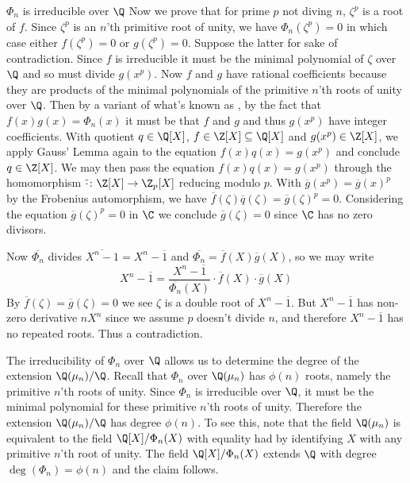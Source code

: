 \begin{theorem}{$\Phi_n$ is irreducible over $\Q$}
    Now we prove that for prime $p$ not diving $n$, $\zeta^p$ is a root of $f$.
    Since $\zeta^p$ is an $n$'th primitive root of unity, we have $\Phi_n(\zeta^p)=0$ in which case either $f(\zeta^p)=0$ or $g(\zeta^p)=0$.
    Suppose the latter for sake of contradiction.
    Since $f$ is irreducible it must be the minimal polynomial of $\zeta$ over $\Q$ and so must divide $g(x^p)$.
    Now $f$ and $g$ have rational coefficients because they are products of the minimal polynomials of the primitive $n$'th roots of unity over $\Q$.
    Then by a variant of what's known as , by the fact that $f(x)g(x)=\Phi_n(x)$ it must be that $f$ and $g$ and thus $g(x^p)$ have integer coefficients.
    With quotient $q\in\Q[X]$, $f\in\Z[X]\subseteq\Q[X]$ and $g(x^p)\in\Z[X]$, we apply Gauss' Lemma again to the equation $f(x)q(x)=g(x^p)$ and conclude $q\in\Z[X]$.
    We may then pass the equation $f(x)q(x)=g(x^p)$ through the homomorphism $\overline{\cdot}\colon\Z[X]\to\Z_p[X]$ reducing modulo $p$.
    With $\overline{g}(x^p)=\overline{g}(x)^p$ by the Frobenius automorphism, we have $\overline{f}(\zeta)\overline{q}(\zeta)=\overline{g}(\zeta)^p=0$.
    Considering the equation $\overline{g}(\zeta)^p=0$ in $\C$ we conclude $\overline{g}(\zeta)=0$ since $\C$ has no zero divisors.

    Now $\overline{\Phi_n}$ divides $\overline{X^n-1}=X^n-\overline{1}$ and $\overline{\Phi_n}=\overline{f}(X)\overline{g}(X)$, so we may write
    \begin{equation}
        X^n-\overline{1} = \frac{X^n-\overline{1}}{\overline{\Phi_n}(X)}
            \cdot\overline{f}(X)\cdot\overline{g}(X)
    \end{equation}
    By $\overline{f}(\zeta)=\overline{g}(\zeta)=0$ we see $\zeta$ is a double root of $X^n-\overline{1}$.
    But $X^n-\overline{1}$ has non-zero derivative $nX^n$ since we assume $p$ doesn't divide $n$, and therefore $X^n-\overline{1}$ has no repeated roots.
    Thus a contradiction.
\end{theorem}

The irreducibility of $\Phi_n$ over $\Q$ allows us to determine the degree of the extension $\Q(\mu_n)/\Q$.
Recall that $\Phi_n$ over $\Q(\mu_n)$ has $\phi(n)$ roots, namely the primitive $n$'th roots of unity.
Since $\Phi_n$ is irreducible over $\Q$, it must be the minimal polynomial for these primitive $n$'th roots of unity.
Therefore the extension $\Q(\mu_n)/\Q$ has degree $\phi(n)$.
To see this, note that the field $\Q(\mu_n)$ is equivalent to the field $\Q[X]/\Phi_n(X)$ with equality had by identifying $X$ with any primitive $n$'th root of unity.
The field $\Q[X]/\Phi_n(X)$ extends $\Q$ with degree $\deg(\Phi_n)=\phi(n)$ and the claim follows.

